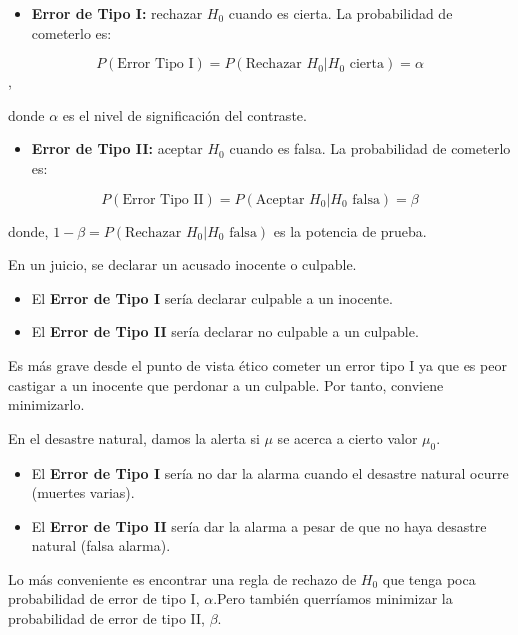 \documentclass[
]{article}
\providecommand{\tightlist}{%
  \setlength{\itemsep}{0pt}\setlength{\parskip}{0pt}}
\begin{document}
\begin{itemize}
\tightlist
\item
  \textbf{Error de Tipo I:} rechazar \(H_0\) cuando es cierta. La
  probabilidad de cometerlo es:
\end{itemize}

\[P (\text{Error Tipo I}) = P (\text{Rechazar } H_0|H_0\text{ cierta}) = \alpha\],

donde \(\alpha\) es el nivel de significación del contraste.

\begin{itemize}
\tightlist
\item
  \textbf{Error de Tipo II:} aceptar \(H_0\) cuando es falsa. La
  probabilidad de cometerlo es:
\end{itemize}

\[P (\text{Error Tipo II}) = P (\text{Aceptar } H_0| H_0\text{ falsa}) = \beta\]

donde, \(1-\beta = P (\text{Rechazar } H_0| H_0\text{ falsa})\) es la
potencia de prueba.

En un juicio, se declarar un acusado inocente o culpable.

\begin{itemize}
\tightlist
\item
  El \textbf{Error de Tipo I} sería declarar culpable a un inocente.
\item
  El \textbf{Error de Tipo II} sería declarar no culpable a un culpable.
\end{itemize}

Es más grave desde el punto de vista ético cometer un error tipo I ya
que es peor castigar a un inocente que perdonar a un culpable. Por
tanto, conviene minimizarlo.

En el desastre natural, damos la alerta si \(\mu\) se acerca a cierto
valor \(\mu_0\).

\begin{itemize}
\tightlist
\item
  El \textbf{Error de Tipo I} sería no dar la alarma cuando el desastre
  natural ocurre (muertes varias).
\item
  El \textbf{Error de Tipo II} sería dar la alarma a pesar de que no
  haya desastre natural (falsa alarma).
\end{itemize}

Lo más conveniente es encontrar una regla de rechazo de \(H_0\) que
tenga poca probabilidad de error de tipo I, \(\alpha\).Pero también
querríamos minimizar la probabilidad de error de tipo II, \(\beta\).
\end{document}
